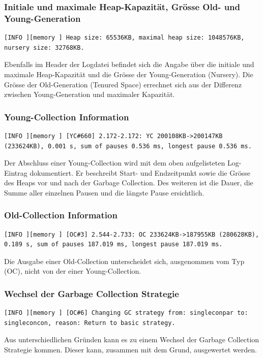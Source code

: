 \subsubsection{Initiale und maximale Heap-Kapazität, Grösse Old- und Young-Generation}
\begin{lstlisting}[numbers=none,  framexleftmargin=0mm, caption=Logdatei: Initiale und maximale Heap-Kapazität und Grösse des Old- und Young-Generation]
[INFO ][memory ] Heap size: 65536KB, maximal heap size: 1048576KB, nursery size: 32768KB.
\end{lstlisting}
Ebenfalls im Header der Logdatei befindet sich die Angabe über die initiale und maximale Heap-Kapazität und die Grösse der Young-Generation (Nursery). Die Grösse der Old-Generation (Tenured Space) errechnet sich aus der Differenz zwischen Young-Generation und maximaler Kapazität.

\subsubsection{Young-Collection Information}
\begin{lstlisting}[numbers=none,  framexleftmargin=0mm, caption=Logdatei: Information Young-Collection]
[INFO ][memory ] [YC#660] 2.172-2.172: YC 200108KB->200147KB (233624KB), 0.001 s, sum of pauses 0.536 ms, longest pause 0.536 ms.
\end{lstlisting}
Der Abschluss einer Young-Collection wird mit dem oben aufgelisteten Log-Eintrag dokumentiert. Er beschreibt Start- und Endzeitpunkt sowie die Grösse des Heaps vor und nach der Garbage Collection. Des weiteren ist die Dauer, die Summe aller einzelnen Pausen und die längste Pause ersichtlich. 

\subsubsection{Old-Collection Information}
\begin{lstlisting}[numbers=none,  framexleftmargin=0mm, caption=Logdatei: Information Old-Collection]
[INFO ][memory ] [OC#3] 2.544-2.733: OC 233624KB->187955KB (280628KB), 0.189 s, sum of pauses 187.019 ms, longest pause 187.019 ms.
\end{lstlisting}
Die Ausgabe einer Old-Collection unterscheidet sich, ausgenommen vom Typ (OC),  nicht von der einer Young-Collection.

\subsubsection{Wechsel der Garbage Collection Strategie}
\begin{lstlisting}[numbers=none,  framexleftmargin=0mm, caption=Logdatei: Wechsel Garbage Collection Strategie]
[INFO ][memory ] [OC#6] Changing GC strategy from: singleconpar to: singleconcon, reason: Return to basic strategy.
\end{lstlisting}
Aus unterschiedlichen Gründen kann es zu einem Wechsel der Garbage Collection Strategie kommen. Dieser kann, zusammen mit dem Grund, ausgewertet werden.


